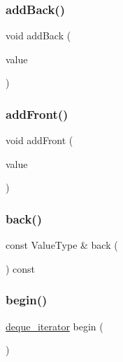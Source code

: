 \mbox{\label{classDeque_a0c733f31bccadf80a6793490b115bd37}} 
\subsubsection{\texorpdfstring{add\+Back()}{addBack()}}
{\footnotesize\ttfamily void add\+Back (\begin{DoxyParamCaption}\item[{const Value\+Type \&}]{value }\end{DoxyParamCaption})}

\mbox{\label{classDeque_a1d5c5f74583e2a0fcd33f177ecbb9aa4}} 
\subsubsection{\texorpdfstring{add\+Front()}{addFront()}}
{\footnotesize\ttfamily void add\+Front (\begin{DoxyParamCaption}\item[{const Value\+Type \&}]{value }\end{DoxyParamCaption})}

\mbox{\label{classDeque_adc761c91bdacd01bed5c96e25fd9486a}} 
\subsubsection{\texorpdfstring{back()}{back()}}
{\footnotesize\ttfamily const Value\+Type \& back (\begin{DoxyParamCaption}{ }\end{DoxyParamCaption}) const}

\mbox{\label{classDeque_ab0616f247b41eeb1a672421386fd5612}} 
\subsubsection{\texorpdfstring{begin()}{begin()}\hspace{0.1cm}{\footnotesize\ttfamily [1/2]}}
{\footnotesize\ttfamily \mbox{\hyperlink{classDeque_1_1deque__iterator}{deque\+\_\+iterator}} begin (\begin{DoxyParamCaption}{ }\end{DoxyParamCaption})\hspace{0.3cm}{\ttfamily [inline]}}

